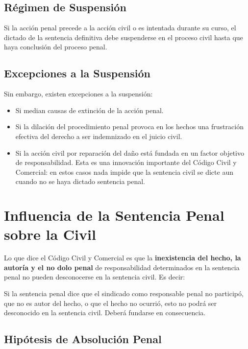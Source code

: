 \documentclass[12pt,oneside]{book}
\begin{document}
\subsection{Régimen de Suspensión}

Si la acción penal precede a la acción civil o es intentada durante su curso, el dictado de la sentencia definitiva debe suspenderse en el proceso civil hasta que haya conclusión del proceso penal.

\subsection{Excepciones a la Suspensión}

Sin embargo, existen excepciones a la suspensión:

\begin{itemize}
    \item Si median causas de extinción de la acción penal.
    \item Si la dilación del procedimiento penal provoca en los hechos una frustración efectiva del derecho a ser indemnizado en el juicio civil.
    \item Si la acción civil por reparación del daño está fundada en un factor objetivo de responsabilidad. Esta es una innovación importante del Código Civil y Comercial: en estos casos nada impide que la sentencia civil se dicte aun cuando no se haya dictado sentencia penal.
\end{itemize}

\section{Influencia de la Sentencia Penal sobre la Civil}

Lo que dice el Código Civil y Comercial es que la \textbf{inexistencia del hecho, la autoría y el no dolo penal} de responsabilidad determinados en la sentencia penal no pueden desconocerse en la sentencia civil. Es decir:

\begin{important}
Si la sentencia penal dice que el sindicado como responsable penal no participó, que no es autor del hecho, o que el hecho no ocurrió, esto no podrá ser desconocido en la sentencia civil. Deberá fundarse en consecuencia.
\end{important}

\subsection{Hipótesis de Absolución Penal}
\end{document}
